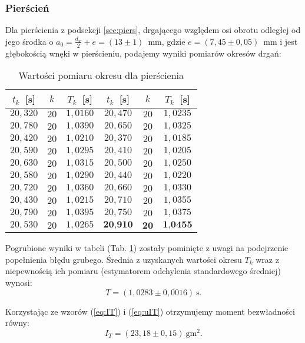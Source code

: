 \documentclass[12pt,a4paper]{article}
\numberwithin{equation}{section}
\begin{document}
\subsubsection{Pierścień}

Dla pierścienia z podsekcji \ref{sec:piers}, drgającego względem osi obrotu odległej od jego środka o $a_0 = \frac{d_w}{2} + e = (13 \pm 1)$~mm, gdzie $e = (7,45 \pm 0,05)$~mm i jest głębokością wnęki w pierścieniu, podajemy wyniki pomiarów okresów drgań:

\begin{table}[!ht]
	\caption{Wartości pomiaru okresu dla pierścienia}
	\centering 
	\begin{tabular}{c|c|c||c|c|c} \hline
		$t_k$~[s] & $k$ & $T_k$~[s] & $t_k$~[s] & $k$ & $T_k$~[s] \\ \hline \hline
		$20,320$ & $20$ & $1,0160$ & $20,470$ & $20$ & $1,0235$ \\
		$20,780$ & $20$ & $1,0390$ & $20,650$ & $20$ & $1,0325$ \\
		$20,420$ & $20$ & $1,0210$ & $20,370$ & $20$ & $1,0185$ \\
		$20,590$ & $20$ & $1,0295$ & $20,410$ & $20$ & $1,0205$ \\
		$20,630$ & $20$ & $1,0315$ & $20,500$ & $20$ & $1,0250$ \\
		$20,580$ & $20$ & $1,0290$ & $20,440$ & $20$ & $1,0220$ \\
		$20,720$ & $20$ & $1,0360$ & $20,660$ & $20$ & $1,0330$ \\
		$20,430$ & $20$ & $1,0215$ & $20,710$ & $20$ & $1,0355$ \\ 
		$20,790$ & $20$ & $1,0395$ & $20,750$ & $20$ & $1,0375$\\ 
		$20,530$ & $20$ & $1,0265$ & $\textbf{20,910}$ & $\textbf{20}$ & $\textbf{1,0455}$\\ \hline
	\end{tabular}
	\label{tab:tab2}
\end{table}

Pogrubione wyniki w tabeli (Tab. \ref{tab:tab2}) zostały pominięte z uwagi na podejrzenie popełnienia błędu grubego. Średnia z uzyskanych wartości okresu $T_k$ wraz z niepewnością ich pomiaru (estymatorem odchylenia standardowego średniej) wynosi:
\begin{equation}
T = (1,0283 \pm 0,0016)~\textrm{s}.
\end{equation}

Korzystając ze wzorów (\ref{eq:IT}) i (\ref{eq:uIT}) otrzymujemy moment bezwładności równy:
\begin{equation}
	I_T = (23,18 \pm 0,15)~\textrm{gm}^2.
\end{equation}
\end{document}
